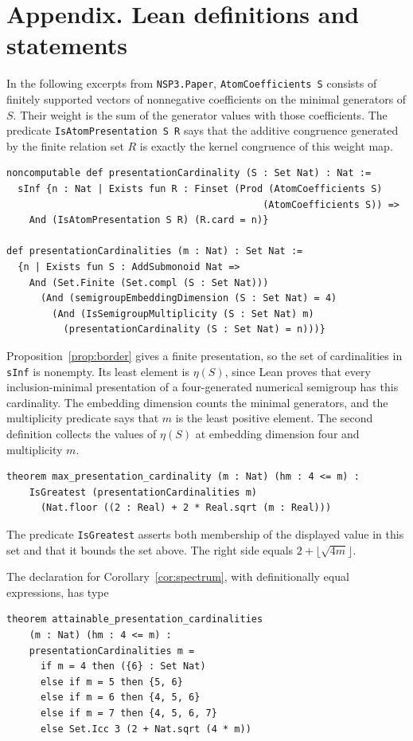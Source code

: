 \documentclass[11pt]{article}
\theoremstyle{definition}
\theoremstyle{remark}
\theoremstyle{plain}
\begin{document}
\section*{Appendix. Lean definitions and statements}
In the following excerpts from \texttt{NSP3.Paper},
\texttt{AtomCoefficients S} consists of finitely supported vectors of
nonnegative coefficients on the minimal generators of $S$.
Their weight is the sum of the generator values with those coefficients.
The predicate \texttt{IsAtomPresentation S R} says that the additive
congruence generated by the finite relation set $R$ is exactly the
kernel congruence of this weight map.

{\small
\begin{verbatim}
noncomputable def presentationCardinality (S : Set Nat) : Nat :=
  sInf {n : Nat | Exists fun R : Finset (Prod (AtomCoefficients S)
                                             (AtomCoefficients S)) =>
    And (IsAtomPresentation S R) (R.card = n)}

def presentationCardinalities (m : Nat) : Set Nat :=
  {n | Exists fun S : AddSubmonoid Nat =>
    And (Set.Finite (Set.compl (S : Set Nat)))
      (And (semigroupEmbeddingDimension (S : Set Nat) = 4)
        (And (IsSemigroupMultiplicity (S : Set Nat) m)
          (presentationCardinality (S : Set Nat) = n)))}
\end{verbatim}
}

Proposition~\ref{prop:border} gives a finite presentation, so the set
of cardinalities in \texttt{sInf} is nonempty. Its least element is
$\eta(S)$, since Lean proves that every inclusion-minimal presentation
of a four-generated numerical semigroup has this cardinality.
The embedding dimension counts the minimal generators, and the
multiplicity predicate says that $m$ is the least positive element.
The second definition collects the values of $\eta(S)$ at embedding
dimension four and multiplicity $m$.

{\small
\begin{verbatim}
theorem max_presentation_cardinality (m : Nat) (hm : 4 <= m) :
    IsGreatest (presentationCardinalities m)
      (Nat.floor ((2 : Real) + 2 * Real.sqrt (m : Real)))
\end{verbatim}
}

The predicate \texttt{IsGreatest} asserts both membership of the displayed
value in this set and that it bounds the set above. The right side equals
$2+\lfloor\sqrt{4m}\rfloor$.

The declaration for Corollary~\ref{cor:spectrum}, with definitionally equal expressions, has type
{\small
\begin{verbatim}
theorem attainable_presentation_cardinalities
    (m : Nat) (hm : 4 <= m) :
    presentationCardinalities m =
      if m = 4 then ({6} : Set Nat)
      else if m = 5 then {5, 6}
      else if m = 6 then {4, 5, 6}
      else if m = 7 then {4, 5, 6, 7}
      else Set.Icc 3 (2 + Nat.sqrt (4 * m))
\end{verbatim}
}
\end{document}
